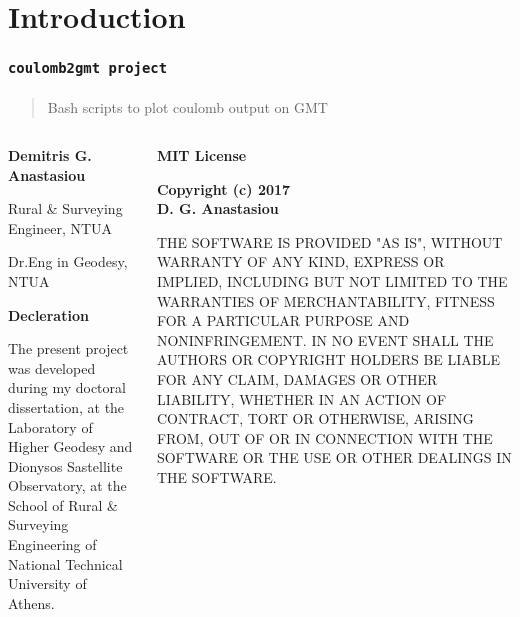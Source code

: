 \section[Intro]{Introduction}
 

\begin{frame}\frametitle{\texttt{coulomb2gmt project}}\framesubtitle{}
\begin{quote}
Bash scripts to plot coulomb output on GMT
\end{quote}
\vskip -1cm
\begin{columns}
  \begin{column}{.5\textwidth}
\textbf{Demitris G. Anastasiou}

\begin{footnotesize}
Rural \& Surveying Engineer, NTUA

Dr.Eng in Geodesy, NTUA
\end{footnotesize}
\vfill
\textbf{Decleration}

\begin{footnotesize}
The present project was developed during my doctoral dissertation, at the Laboratory 
of Higher Geodesy and Dionysos Sastellite Observatory, at the School of Rural \& Surveying
Engineering of National Technical University of Athens.
\end{footnotesize}
  \end{column}
  \begin{column}{.5\textwidth}
\begin{tiny}

\begin{flushright}
\textbf{MIT License}

\textbf{Copyright (c) 2017\\D. G. Anastasiou}
\end{flushright}


THE SOFTWARE IS PROVIDED "AS IS", WITHOUT WARRANTY OF ANY KIND, EXPRESS OR
IMPLIED, INCLUDING BUT NOT LIMITED TO THE WARRANTIES OF MERCHANTABILITY,
FITNESS FOR A PARTICULAR PURPOSE AND NONINFRINGEMENT. IN NO EVENT SHALL THE
AUTHORS OR COPYRIGHT HOLDERS BE LIABLE FOR ANY CLAIM, DAMAGES OR OTHER
LIABILITY, WHETHER IN AN ACTION OF CONTRACT, TORT OR OTHERWISE, ARISING FROM,
OUT OF OR IN CONNECTION WITH THE SOFTWARE OR THE USE OR OTHER DEALINGS IN THE
SOFTWARE.
\end{tiny}
  \end{column}
\end{columns}

\end{frame}

